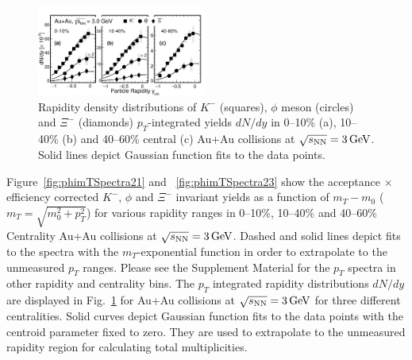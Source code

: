 \documentclass[aps,tightenlines,superscriptaddress,twocolumn]{revtex4-1}
\begin{document}
\begin{table}
\end{table}

\begin{figure}
\centering
\hspace*{-4mm}
\includegraphics[width=0.5\textwidth]{fig3_dndy-eps-converted-to.pdf}
  \caption{Rapidity density distributions of $K^-$ (squares), $\phi$ meson (circles) and $\Xi^-$ (diamonds) $p_T$-integrated yields $dN/dy$ in 0--10\% (a), 10--40\% (b) and 40--60\% central (c) Au+Au collisions at ${\sqrt{s_{\rm NN}} = \rm{3\,GeV}}$.
  Solid lines depict Gaussian function fits to the data points.}
\label{fig:phiYSpectra} 
\end{figure}




Figure~\ref{fig:phimTSpectra21} and ~\ref{fig:phimTSpectra23} show the acceptance $\times$ efficiency corrected $K^-$, $\phi$ and $\Xi^-$ invariant yields as a function of $m_T-m_0$ ($m_T = \sqrt{m_{0}^{2}+p_{T}^2}$) for various rapidity ranges in 0--10\%, 10--40\% and 40--60\% Centrality Au+Au collisions at ${\sqrt{s_{\rm NN}} = \rm{3\,GeV}}$. 
Dashed and solid lines depict fits to the spectra with the $m_T$-exponential function in order to extrapolate to the unmeasured $p_T$ ranges. Please see the Supplement Material for the $p_T$ spectra in other rapidity and centrality bins.
The $p_T$ integrated rapidity distributions $dN/dy$ are displayed in Fig.~\ref{fig:phiYSpectra} for Au+Au collisions at ${\sqrt{s_{\rm NN}} = \rm{3\,GeV}}$ for three different centralities. 
Solid curves depict Gaussian function fits to the data points with the centroid parameter fixed to zero. They are used to extrapolate to the unmeasured rapidity region for calculating total multiplicities.
\end{document}
